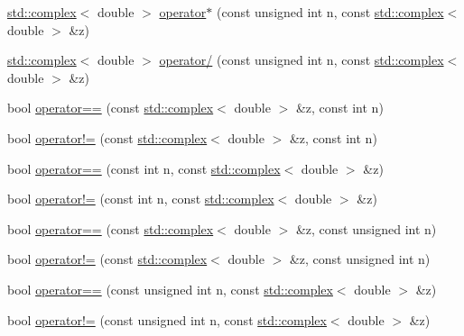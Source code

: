 \begin{DoxyCompactItemize}
\item 
\hyperlink{Constants_8h_a1c1b16cc02d518bbe753449171ab7033}{std\-::complex}$<$ double $>$ \hyperlink{complex__functions_8H_a476f0db7a350e6fe466fbae7ef3038f0}{operator$\ast$} (const unsigned int n, const \hyperlink{Constants_8h_a1c1b16cc02d518bbe753449171ab7033}{std\-::complex}$<$ double $>$ \&z)
\item 
\hyperlink{Constants_8h_a1c1b16cc02d518bbe753449171ab7033}{std\-::complex}$<$ double $>$ \hyperlink{complex__functions_8H_aa271ebe4604029a750ea72bcb2f89fe0}{operator/} (const unsigned int n, const \hyperlink{Constants_8h_a1c1b16cc02d518bbe753449171ab7033}{std\-::complex}$<$ double $>$ \&z)
\item 
bool \hyperlink{complex__functions_8H_ab4f3a4f713bb7eb3ee1efbc55b0fe6b4}{operator==} (const \hyperlink{Constants_8h_a1c1b16cc02d518bbe753449171ab7033}{std\-::complex}$<$ double $>$ \&z, const int n)
\item 
bool \hyperlink{complex__functions_8H_ac7f24ab4fcfe32ad4ceb2225458ed9ac}{operator!=} (const \hyperlink{Constants_8h_a1c1b16cc02d518bbe753449171ab7033}{std\-::complex}$<$ double $>$ \&z, const int n)
\item 
bool \hyperlink{complex__functions_8H_a5126c5261524dd4f62d47c3fc03affa0}{operator==} (const int n, const \hyperlink{Constants_8h_a1c1b16cc02d518bbe753449171ab7033}{std\-::complex}$<$ double $>$ \&z)
\item 
bool \hyperlink{complex__functions_8H_aa57dd805e0ddbf59353aa6e51de692f7}{operator!=} (const int n, const \hyperlink{Constants_8h_a1c1b16cc02d518bbe753449171ab7033}{std\-::complex}$<$ double $>$ \&z)
\item 
bool \hyperlink{complex__functions_8H_a515e8263d774c380b611a7c493582917}{operator==} (const \hyperlink{Constants_8h_a1c1b16cc02d518bbe753449171ab7033}{std\-::complex}$<$ double $>$ \&z, const unsigned int n)
\item 
bool \hyperlink{complex__functions_8H_aa214fda12d2dee1254ada5ed128d5254}{operator!=} (const \hyperlink{Constants_8h_a1c1b16cc02d518bbe753449171ab7033}{std\-::complex}$<$ double $>$ \&z, const unsigned int n)
\item 
bool \hyperlink{complex__functions_8H_a0a735aeb2a0c03d9bc8b4e9963b77fcd}{operator==} (const unsigned int n, const \hyperlink{Constants_8h_a1c1b16cc02d518bbe753449171ab7033}{std\-::complex}$<$ double $>$ \&z)
\item 
bool \hyperlink{complex__functions_8H_ab669dc3031c87d795acf1e710f3bf33d}{operator!=} (const unsigned int n, const \hyperlink{Constants_8h_a1c1b16cc02d518bbe753449171ab7033}{std\-::complex}$<$ double $>$ \&z)

\end{DoxyCompactItemize}
